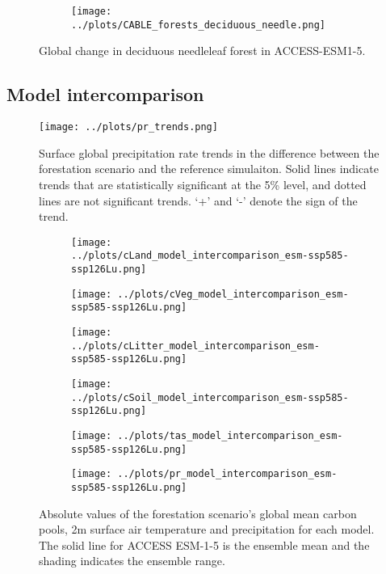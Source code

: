 \documentclass[]{article}
\begin{document}
\begin{figure}[H]
    \centering
    \begin{subfigure}[b]{0.45\linewidth}
        \texttt{[image: ../plots/CABLE\_forests\_deciduous\_needle.png]}
    \end{subfigure}
    \caption{Global change in deciduous needleleaf forest in ACCESS-ESM1-5.}
    \label{fig:ACCESS_dec_needle_cover}
\end{figure}

\subsection{Model intercomparison}

\begin{figure}[H]
    \centering
    \texttt{[image: ../plots/pr\_trends.png]}
    \caption{Surface global precipitation rate trends in the difference between the forestation scenario and the reference simulaiton. Solid lines indicate trends that are statistically significant at the 5\% level, and dotted lines are not significant trends. `+' and `-' denote the sign of the trend.}
    \label{fig:models_pr_trends}
\end{figure}

\begin{figure}[H]
    \centering
    \begin{subfigure}[b]{0.45\linewidth}
        \texttt{[image: ../plots/cLand\_model\_intercomparison\_esm-ssp585-ssp126Lu.png]}
    \end{subfigure}
    \begin{subfigure}[b]{0.45\linewidth}
        \texttt{[image: ../plots/cVeg\_model\_intercomparison\_esm-ssp585-ssp126Lu.png]}
    \end{subfigure}
    \begin{subfigure}[b]{0.45\linewidth}
        \texttt{[image: ../plots/cLitter\_model\_intercomparison\_esm-ssp585-ssp126Lu.png]}
    \end{subfigure}
    \begin{subfigure}[b]{0.45\linewidth}
        \texttt{[image: ../plots/cSoil\_model\_intercomparison\_esm-ssp585-ssp126Lu.png]}
    \end{subfigure}
    \begin{subfigure}[b]{0.45\linewidth}
        \texttt{[image: ../plots/tas\_model\_intercomparison\_esm-ssp585-ssp126Lu.png]}
    \end{subfigure}
    \begin{subfigure}[b]{0.45\linewidth}
        \texttt{[image: ../plots/pr\_model\_intercomparison\_esm-ssp585-ssp126Lu.png]}
    \end{subfigure}
    \caption{Absolute values of the forestation scenario's global mean carbon pools, 2m surface air temperature and precipitation for each model. The solid line for ACCESS ESM-1-5 is the ensemble mean and the shading indicates the ensemble range.}
    \label{fig:models_absolute}
\end{figure}
\end{document}
